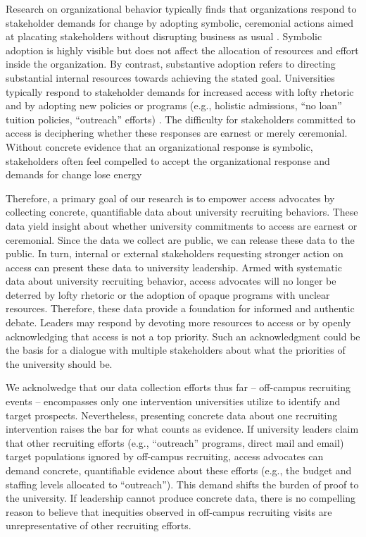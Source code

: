 \documentclass[twoside]{article}
\begin{document}
Research on organizational behavior typically finds that organizations respond to stakeholder demands for change by adopting symbolic, ceremonial actions aimed at placating stakeholders without disrupting business as usual \citep{RN513,RN1714}.  Symbolic adoption is highly visible but does not affect the allocation of resources and effort inside the organization. By contrast, substantive adoption refers to directing substantial internal resources towards achieving the stated goal. Universities typically respond to stakeholder demands for increased access with lofty rhetoric and by adopting new policies or programs (e.g., holistic admissions, ``no loan'' tuition policies, ``outreach'' efforts) \citep[e.g., ][]{RN4017}.  The difficulty for stakeholders committed to access is deciphering whether these responses are earnest or merely ceremonial. Without concrete evidence that an organizational response is symbolic, stakeholders often feel compelled to accept the organizational response and demands for change lose energy

Therefore, a primary goal of our research is to empower access advocates by collecting concrete, quantifiable data about university recruiting behaviors. These data yield insight about whether university commitments to access are earnest or ceremonial.  Since the data we collect are public, we can release these data to the public. In turn, internal or external stakeholders requesting stronger action on access can present these data to university leadership.  Armed with systematic data about university recruiting behavior, access advocates will no longer be deterred by lofty rhetoric or the adoption of opaque programs with unclear resources.  Therefore, these data provide a foundation for informed and authentic debate.  Leaders may respond by devoting more resources to access or by openly acknowledging that access is not a top priority. Such an acknowledgment could be the basis for a dialogue with multiple stakeholders about what the priorities of the university should be.

We acknolwedge that our data collection efforts thus far -- off-campus recruiting events -- encompasses only one intervention universities utilize to identify and target prospects. Nevertheless, presenting concrete data about one recruiting intervention raises the bar for what counts as evidence. If university leaders claim that other recruiting efforts (e.g., ``outreach'' programs, direct mail and email) target populations ignored by off-campus recruiting, access advocates can demand concrete, quantifiable evidence about these efforts (e.g., the budget and staffing levels allocated to ``outreach'').  This demand shifts the burden of proof to the university. If leadership cannot produce concrete data, there is no compelling reason to believe that inequities observed in off-campus recruiting visits are unrepresentative of other recruiting efforts. 
\end{document}
